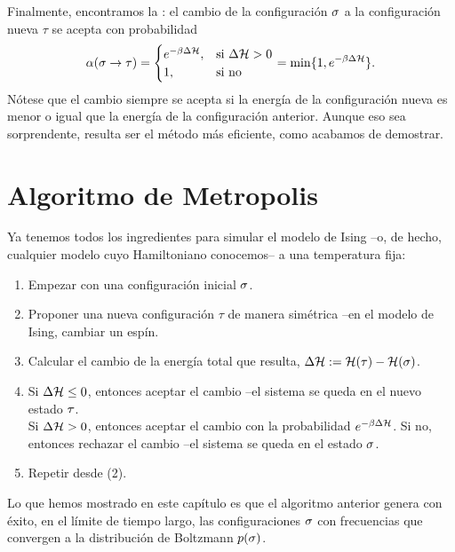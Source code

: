 Finalmente, encontramos la : el cambio de la configuración $\ss$ a la configuración nueva $\tau$ se acepta con probabilidad
\begin{equation}
 \alpha(\ss \to \tt) = \begin{cases}
                        e^{-\beta \Delta \HH}, &\text{si } \Delta \HH > 0\\
		      1, &\text{si no}
                       \end{cases}
= \min\{1, e^{-\beta \Delta \HH} \}.
\end{equation}
Nótese que el cambio siempre se acepta si la energía de la configuración nueva es menor o igual que la energía de la configuración anterior.
Aunque eso sea sorprendente, resulta ser el método más eficiente, como acabamos de demostrar.

\section{Algoritmo de Metropolis}
Ya tenemos todos los ingredientes para simular el modelo de Ising --o, de hecho, cualquier modelo cuyo Hamiltoniano conocemos-- a una temperatura fija:
\begin{enumerate}

\item Empezar con una configuración inicial $\ss$.
\item Proponer una nueva configuración $\tau$ de manera simétrica --en el modelo de Ising, cambiar un espín.
\item Calcular el cambio de la energía total que resulta, $\Delta \HH \defeq \HH(\tt) - \HH(\ss)$.
\item Si $\Delta \HH \le 0$, entonces aceptar el cambio --el sistema se queda en el nuevo estado $\tt$.\\
  Si $\Delta \HH > 0$, entonces aceptar el cambio con la probabilidad $e^{-\beta \Delta \HH}$. Si no, entonces rechazar el cambio --el sistema se queda en el estado $\ss$.
\item Repetir desde (2).
\end{enumerate}

Lo que hemos mostrado en este capítulo es que el algoritmo anterior genera con éxito, en el límite de tiempo largo, las configuraciones $\ss$ con frecuencias que convergen a la distribución de Boltzmann $p(\ss)$.







